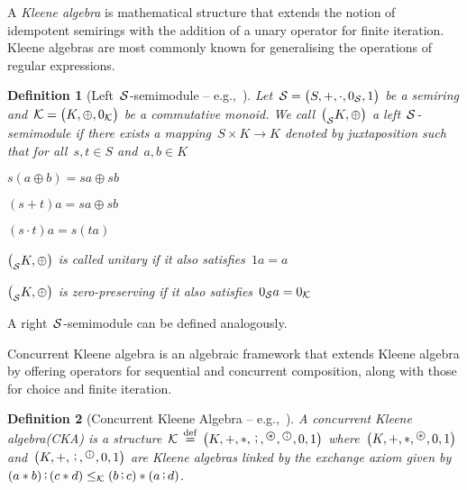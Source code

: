 \documentclass[copyright,creativecommons]{eptcs}
\makeatletter
\newcommand{\eg}{\textrm{e.g.,}\@\xspace}
\newcommand{\monoid}[3]{\big(#1, #2, #3 \big)}
\newcommand{\semiring}[5]{\big(#1, #2, #3, #4, #5\big)}
\newcommand{\Lsemimodule}[3]{\big(_{#1}#2, #3\big)}
\newcommand{\bigP}[1]{\big( #1 \big)}
\newcommand{\deq}{\spaces{\stackrel{\mathrm{def}}{=}}}
\newcommand{\spaces}[1]{\,#1\,}
\newcommand{\KA}{Kleene algebra\@\xspace}
\newcommand{\CKA}{concurrent Kleene algebra\@\xspace}
\newcommand{\CKAabbrv}{CKA\@\xspace}
\newcommand{\CKAset}{K}
\newcommand{\CKApar}{*}
\newcommand{\CKAseq}{\raise.3ex\hbox{\,\rm;\,}}
\newcommand{\CKAiterSeqOp}{\text{\scriptsize \textcircled{\raise.3ex\hbox{\,\rm;\,}}}}
\newcommand{\CKAiterParOp}{\text{\scriptsize \textcircled{\raise-.75ex\hbox{\,*\,}}}}
\newcommand{\CKAiterSeq}[1]{{#1}^\CKAiterSeqOp}
\newcommand{\CKAiterPar}[1]{{#1}^\CKAiterParOp}
\newcommand{\cka}{{\cal K}}
\newcommand{\CKAstructure}{\bigP{\CKAset, +, \CKApar, \CKAseq, \CKAiterPar{}, \CKAiterSeq{}, 0, 1}}
\newcommand{\CKAstructurePar}{\bigP{\CKAset, +, \CKApar, \CKAiterPar{}, 0, 1}}
\newcommand{\CKAstructureSeq}{\bigP{\CKAset, +, \CKAseq, \CKAiterSeq{}, 0, 1}}
\newcommand{\CKAle}{\le_{\cka}}
\newcommand{\STIMset}{S}
\newcommand{\STIMplus}{\oplus}
\newcommand{\stim}{{\cal S}}
\newcommand{\rightSemimodule}[1]{right~$#1$-semimodule\@\xspace}
\newcommand{\leftSemimodule}[1]{left~$#1$-semimodule\@\xspace}
\newcommand{\LeftSemimodule}[1]{Left~$#1$-semimodule\@\xspace}
\newtheorem{definition}{Definition}
\makeatother
\begin{document}
A \emph{\KA} is mathematical structure that extends the notion of idempotent semirings with the addition of a unary operator for finite iteration. Kleene algebras are most commonly known for generalising the operations of regular expressions.

\begin{definition}[\LeftSemimodule{\stim} -- \eg~\cite{Hebisch1993aa}]
\label{def:semimodule}
	Let~$\stim = \semiring{\STIMset}{+}{\cdot}{0_\stim}{1}$ be a semiring and~$\cka = \monoid{\CKAset}{\STIMplus}{0_\cka}$ be a commutative monoid. We call~$\Lsemimodule{\stim}{\CKAset}{\STIMplus}$ a \emph{\leftSemimodule{\stim}} if there exists a mapping~$\STIMset \times \CKAset \to \CKAset$ denoted by juxtaposition such that for all~$s,t \in \STIMset$ and~$a,b \in \CKAset$
	\begin{enumerate}[(i)]
		\begin{minipage}[t]{0.4\linewidth}   
			\item \label{def:SM_dist_Kplus}
				$s(a \STIMplus b) = sa \STIMplus sb$
			\item \label{def:SM_dist_Splus}
				$(s + t)a = sa \STIMplus sb$
			\item \label{def:SM_assoc_seq}
				$(s \cdot t)a = s(ta)$
		\end{minipage}
	  	\begin{minipage}[t]{0.6\linewidth}
			\item \label{def:SM_id}
				$\Lsemimodule{\stim}{\CKAset}{\STIMplus}$ is called \emph{unitary} if it also satisfies~$1a = a$
			\item \label{def:SM_zero}
				$\Lsemimodule{\stim}{\CKAset}{\STIMplus}$ is \emph{zero-preserving} if it also satisfies~$0_{\stim}a = 0_\cka$
			\textcolor{white}{\item}      
	  	\end{minipage}
	\end{enumerate}
\end{definition}

A \rightSemimodule{\stim} can be defined analogously. 

Concurrent Kleene algebra is an algebraic framework that extends \KA by offering operators for sequential and concurrent composition, along with those for choice and finite iteration. 

\begin{definition}[Concurrent Kleene Algebra -- \eg~\cite{Hoare2009aa}]
\label{def:CKA}
	A \emph{\CKA (\CKAabbrv)} is a structure~$\cka \deq \CKAstructure$ where~$\CKAstructurePar$ and~$\CKAstructureSeq$ are Kleene algebras linked by the \emph{exchange axiom} given by~$(a \CKApar b) \CKAseq (c \CKApar d) \CKAle (b \CKAseq c) \CKApar (a \CKAseq d)$.
\end{definition}
\end{document}

